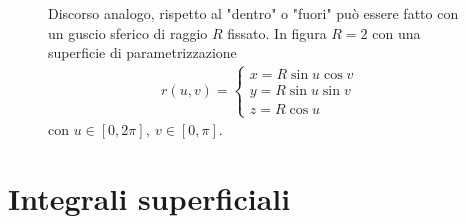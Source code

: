 \begin{example}
\begin{figure}[H]
\begin{minipage}{0.4\textwidth}
    Discorso analogo, rispetto al "dentro" o "fuori" può essere fatto con un guscio sferico di raggio $R$ fissato. In figura $R=2$ con una superficie di parametrizzazione
    \begin{align*}
    r(u,v)=\begin{cases}
        x= R \sin u \cos v\\
        y= R \sin u \sin v\\
        z= R \cos u
    \end{cases}    
    \end{align*}
    con $u \in [0, 2\pi],\ v \in [0, \pi]$.
    \end{minipage}
    \end{figure}
 \end{example}
\section{Integrali superficiali}